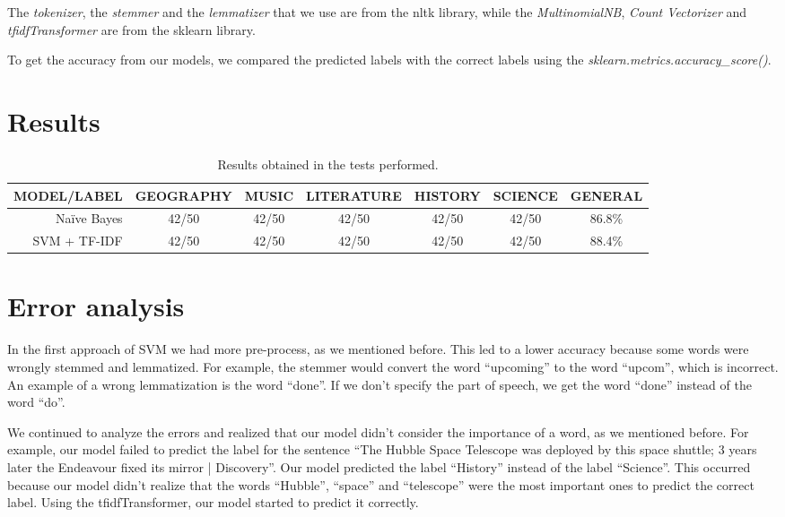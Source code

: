\documentclass[11pt]{article}
\begin{document}
The \emph{tokenizer}, the \emph{stemmer} and the \emph{lemmatizer} that we use are from the nltk library, while the \emph{MultinomialNB}, \emph{Count Vectorizer} and \emph{tfidfTransformer} are from the sklearn library.

To get the accuracy from our models, we compared the predicted labels with the correct labels using the \emph{sklearn.metrics.accuracy\_score()}.


\section{Results}
\begin{table}[!htbp]
    \centering
    \begin{tabular}{r|c|c|c|c|c|c}
    MODEL/LABEL & GEOGRAPHY & MUSIC & LITERATURE & HISTORY & SCIENCE & GENERAL \\\hline
    Naïve Bayes & 42/50 & 42/50 & 42/50 & 42/50 & 42/50 & 86.8\% \\
    SVM + TF-IDF & 42/50 & 42/50 & 42/50 & 42/50 & 42/50 & 88.4\%
    \end{tabular}
    \caption{\label{tab:widgets}Results obtained in the tests performed.}
\end{table}

\section{Error analysis}

In the first approach of SVM we had more pre-process, as we mentioned before. This led to a lower accuracy because some words were wrongly stemmed and lemmatized. For example, the stemmer would convert the word “upcoming” to the word “upcom”, which is incorrect. An example of a wrong lemmatization is the word “done”. If we don’t specify the part of speech, we get the word “done” instead of the word “do”.

We continued to analyze the errors and realized that our model didn’t consider the importance of a word, as we mentioned before. For example, our model failed to predict the label for the sentence “The Hubble Space Telescope was deployed by this space shuttle; 3 years later the Endeavour fixed its mirror | Discovery”. Our model predicted the label “History” instead of the label “Science”. This occurred because our model didn’t realize that the words “Hubble”, “space” and “telescope” were the most important ones to predict the correct label. Using the tfidfTransformer, our model started to predict it correctly.
\end{document}
